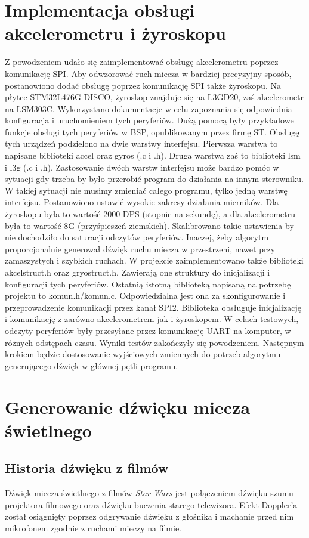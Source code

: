 \documentclass[10pt, a4paper]{article}
\begin{document}
	\section{Implementacja obsługi akcelerometru i żyroskopu}
	Z powodzeniem udało się zaimplementować obsługę akcelerometru poprzez komunikację SPI. Aby odwzorować ruch miecza w bardziej precyzyjny sposób, postanowiono dodać obsługę poprzez komunikację SPI także żyroskopu. Na płytce STM32L476G-DISCO, żyroskop znajduje się na L3GD20, zaś akcelerometr na LSM303C. Wykorzystano dokumentacje w celu zapoznania się odpowiednia konfiguracja i uruchomieniem tych peryferiów. Dużą pomocą były przykładowe funkcje obsługi tych peryferiów w BSP, opublikowanym przez firmę ST. Obsługę tych urządzeń podzielono na dwie warstwy interfejsu. Pierwsza warstwa to napisane biblioteki accel oraz gyros (.c i .h). Druga warstwa zaś to biblioteki lsm i l3g (.c i .h). Zastosowanie dwóch warstw interfejsu może bardzo pomóc w sytuacji gdy trzeba by było przerobić program do działania na innym sterowniku. W takiej sytuacji nie musimy zmieniać całego programu, tylko jedną warstwę interfejsu. 
Postanowiono ustawić wysokie zakresy działania mierników. Dla żyroskopu była to wartość 2000 DPS (stopnie na sekundę), a dla akcelerometru była to wartość 8G (przyśpieszeń ziemskich). Skalibrowano takie ustawienia by nie dochodziło do saturacji odczytów peryferiów. Inaczej, żeby algorytm proporcjonalnie generował dźwięk ruchu miecza w przestrzeni, nawet przy zamaszystych i szybkich ruchach. 
W projekcie zaimplementowano także biblioteki akcelstruct.h oraz gryostruct.h. Zawierają one struktury do inicjalizacji i konfiguracji tych peryferiów. Ostatnią istotną biblioteką napisaną na potrzebę projektu to komun.h/komun.c. Odpowiedzialna jest ona za skonfigurowanie i przeprowadzenie komunikacji przez kanał SPI2. Biblioteka obsługuje inicjalizację i komunikację z zarówno akcelerometrem jak i żyroskopem. 
W celach testowych, odczyty peryferiów były przesyłane przez komunikację UART na komputer, w różnych odstępach czasu. Wyniki testów zakończyły się powodzeniem. Następnym krokiem będzie dostosowanie wyjściowych zmiennych do potrzeb algorytmu generującego dźwięk w głównej pętli programu. 

\section{Generowanie dźwięku miecza świetlnego}
\subsection{Historia dźwięku z filmów}
Dźwięk miecza świetlnego z filmów \textit{Star Wars} jest połączeniem dźwięku szumu projektora filmowego oraz dźwięku buczenia starego telewizora. Efekt Doppler'a został osiągnięty poprzez odgrywanie dźwięku z głośnika i machanie przed nim mikrofonem zgodnie z ruchami mieczy na filmie.
\end{document}

